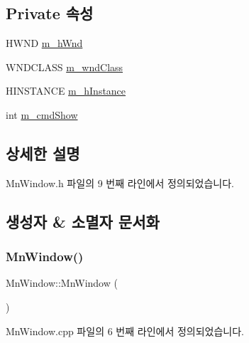 \subsection*{Private 속성}
\begin{DoxyCompactItemize}
\item 
H\+W\+ND \hyperlink{class_m_n_l_1_1_mn_window_a8a2b698033142d80cdbe8abb7d145bea}{m\+\_\+h\+Wnd}
\item 
W\+N\+D\+C\+L\+A\+SS \hyperlink{class_m_n_l_1_1_mn_window_a16043be780f269eb013a17474fda78d3}{m\+\_\+wnd\+Class}
\item 
H\+I\+N\+S\+T\+A\+N\+CE \hyperlink{class_m_n_l_1_1_mn_window_ad41a270174c8c185251aab472af9f2ec}{m\+\_\+h\+Instance}
\item 
int \hyperlink{class_m_n_l_1_1_mn_window_a520254a97241fe49a2f70ab3291b3aa6}{m\+\_\+cmd\+Show}
\end{DoxyCompactItemize}


\subsection{상세한 설명}


Mn\+Window.\+h 파일의 9 번째 라인에서 정의되었습니다.



\subsection{생성자 \& 소멸자 문서화}
\mbox{\label{class_m_n_l_1_1_mn_window_abf8973f11c6633e9d068abb26e7030a1}} 
\subsubsection{\texorpdfstring{Mn\+Window()}{MnWindow()}}
{\footnotesize\ttfamily Mn\+Window\+::\+Mn\+Window (\begin{DoxyParamCaption}{ }\end{DoxyParamCaption})}



Mn\+Window.\+cpp 파일의 6 번째 라인에서 정의되었습니다.

\mbox{\label{class_m_n_l_1_1_mn_window_a180fc3e3ef072d8842de655b2aa8ea1c}} 
